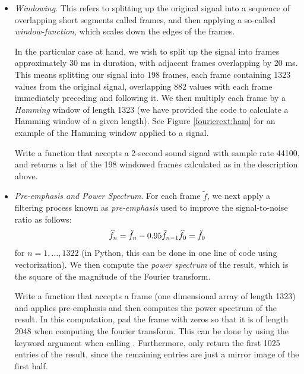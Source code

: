 \begin{itemize}
\item \emph{Windowing}. This refers to splitting up the original signal into a sequence of overlapping
short segments called frames, and then applying a so-called \emph{window-function}, which scales down
the edges of the frames.

In the particular case at hand, we wish to split up the signal into frames approximately 30 ms in
duration, with adjacent frames overlapping by 20 ms. This means splitting our signal into $198$ frames,
each frame containing $1323$ values from the original signal, overlapping $882$ values with each frame
immediately preceding and following it. We then multiply each frame by a \emph{Hamming} window of length
1323 (we have provided the code to calculate a Hamming window of a given length). See Figure
\ref{fourierext:ham} for an example of the Hamming window applied to a signal.

\begin{problem}
Write a function  that accepts a 2-second sound signal with sample rate 44100, and
returns a list of the 198 windowed frames calculated as in the description above.
\end{problem}

\item \emph{Pre-emphasis and Power Spectrum}. For each frame $\tilde{f}$, we next apply
a filtering process known as \emph{pre-emphasis} used to improve the signal-to-noise ratio as follows:
\begin{equation*}
\widehat{f}_{n} = \tilde{f}_{n} - 0.95 \tilde{f}_{n-1}\\
\widehat{f}_0 = \tilde{f}_0
\end{equation*}
for $n = 1,\ldots,1322$ (in Python, this can be done in one line of code using vectorization).
We then compute the \emph{power spectrum} of the result, which is the square of the magnitude of the
Fourier transform.

\begin{problem}
Write a function  that accepts a frame (one dimensional array of length 1323) and
applies pre-emphasis and then computes the power spectrum of the result. In this computation,
pad the frame with zeros so that it is of length 2048 when computing the fourier transform. This
can be done by using the keyword argument  when calling
. Furthermore, only return the first 1025 entries of the result,
since the remaining entries are just a mirror image of the first half.
\end{problem}


\end{itemize}
